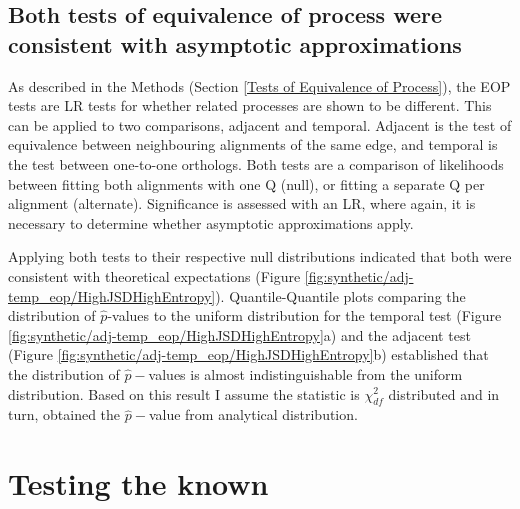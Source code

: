 

\subsection{Both tests of equivalence of process were consistent with asymptotic approximations}

As described in the Methods (Section \ref{Tests of Equivalence of Process}), the EOP tests are LR tests for whether related processes are shown to be different. This can be applied to two comparisons, adjacent and temporal. Adjacent is the test of equivalence between neighbouring alignments of the same edge, and temporal is the test between one-to-one orthologs. Both tests are a comparison of likelihoods between fitting both alignments with one $\mathrm{Q}$ (null), or fitting a separate $\mathrm{Q}$ per alignment (alternate). Significance is assessed with an LR, where again, it is necessary to determine whether asymptotic approximations apply. 

Applying both tests to their respective null distributions indicated that both were consistent with theoretical expectations (Figure \ref{fig:synthetic/adj-temp_eop/HighJSDHighEntropy}). Quantile-Quantile plots comparing the distribution of $\hat p$-values to the uniform distribution for the temporal test (Figure \ref{fig:synthetic/adj-temp_eop/HighJSDHighEntropy}a) and the adjacent test (Figure \ref{fig:synthetic/adj-temp_eop/HighJSDHighEntropy}b) established that the distribution of $\hat p-$values is almost indistinguishable from the uniform distribution. Based on this result I assume the statistic is $\chi^2_{df}$ distributed and in turn, obtained the $\hat p-$value from analytical distribution. 



\section{Testing the known}

